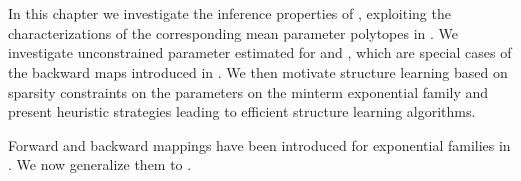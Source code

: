 \chapter{\chatextnetworkReasoning}\label{cha:networkReasoning}

In this chapter we investigate the inference properties of \HybridLogicNetworks{}, exploiting the characterizations of the corresponding mean parameter polytopes in .
We investigate unconstrained parameter estimated for \MarkovLogicNetworks{} and \HybridLogicNetworks{}, which are special cases of the backward maps introduced in .
We then motivate structure learning based on sparsity constraints on the parameters on the minterm exponential family and present heuristic strategies leading to efficient structure learning algorithms.





Forward and backward mappings have been introduced for exponential families in .
We now generalize them to \HybridLogicNetworks{}.


